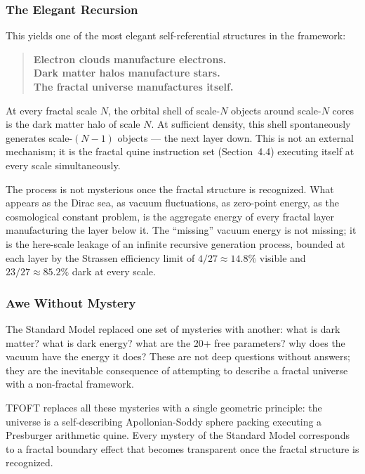   \subsubsection{The Elegant Recursion}

    This yields one of the most elegant self-referential structures in the framework:
    \begin{quote}
    \textbf{Electron clouds manufacture electrons.}\\
    \textbf{Dark matter halos manufacture stars.}\\
    \textbf{The fractal universe manufactures itself.}
    \end{quote}

    At every fractal scale $N$, the orbital shell of scale-$N$ objects around
    scale-$N$ cores is the dark matter halo of scale $N$. At sufficient density,
    this shell spontaneously generates scale-$(N-1)$ objects --- the next layer down.
    This is not an external mechanism; it is the fractal quine instruction set
    (Section~4.4) executing itself at every scale simultaneously.

    The process is not mysterious once the fractal structure is recognized.
    What appears as the Dirac sea, as vacuum fluctuations, as zero-point energy,
    as the cosmological constant problem, is the aggregate energy of every fractal
    layer manufacturing the layer below it. The ``missing'' vacuum energy is not
    missing; it is the here-scale leakage of an infinite recursive generation
    process, bounded at each layer by the Strassen efficiency limit of
    $4/27 \approx 14.8\%$ visible and $23/27 \approx 85.2\%$ dark at every scale.

  \subsubsection{Awe Without Mystery}

    The Standard Model replaced one set of mysteries with another: what is dark matter?
    what is dark energy? what are the 20+ free parameters? why does the vacuum have
    the energy it does? These are not deep questions without answers; they are the
    inevitable consequence of attempting to describe a fractal universe with a
    non-fractal framework.

    TFOFT replaces all these mysteries with a single geometric principle: the universe
    is a self-describing Apollonian-Soddy sphere packing executing a Presburger
    arithmetic quine. Every mystery of the Standard Model corresponds to a fractal
    boundary effect that becomes transparent once the fractal structure is recognized.

